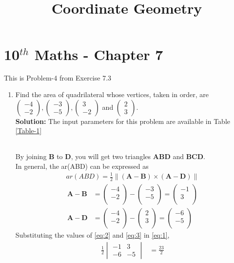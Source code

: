 \documentclass[12pt]{article}
\newcommand{\mydet}[1]{\ensuremath{\begin{vmatrix}#1\end{vmatrix}}}
\providecommand{\brak}[1]{\ensuremath{\left(#1\right)}}
\providecommand{\norm}[1]{\left\lVert#1\right\rVert}
\newcommand{\solution}{\noindent \textbf{Solution: }}
\newcommand{\myvec}[1]{\ensuremath{\begin{pmatrix}#1\end{pmatrix}}}
\let\vec\mathbf
\begin{document}
\begin{center}
\title{\textbf{Coordinate Geometry}}
\date{\vspace{-5ex}} %
\maketitle
\end{center}
\setcounter{page}{1}
\section*{10$^{th}$ Maths - Chapter 7}
This is Problem-4 from Exercise 7.3
\begin{enumerate}
\item Find the area of quadrilateral whose vertices, taken in order, are $\myvec{-4 \\ -2}, \myvec{-3\\-5}, \myvec{3\\-2}$ and $\myvec{2\\3}$.\\
	\solution The input parameters for this problem are available in Table \eqref{Table-1}
\begin{table}[ht!]\centering

\caption{}
\label{Table-1}	
\end{table}
\\By joining $\vec{B}$ to $\vec{D}$, you will get two triangles $\vec{A}\vec{B}\vec{D}$ and $\vec{B}\vec{C}\vec{D}$.\\
		In general, the ar(ABD) can be expressed as
  \begin{align}
	  ar(ABD)=\frac{1}{2} \norm{\brak{\vec{A}-\vec{B}}  \times 
   \brak{\vec{A}- \vec{D}}} \label{eq:1} 
\end{align}
\begin{align}
	\vec{A}- \vec{B} &= \myvec{-4\\-2\\}-\myvec{-3\\-5\\}=\myvec{-1\\3\\}\label{eq:2}\\
	  \vec{A}- \vec{D} &= \myvec{-4\\-2\\}-\myvec{2\\3\\}=\myvec{-6\\-5\\}\label{eq:3}
  \end{align}
Substituting the values of \eqref{eq:2} and \eqref{eq:3} in \eqref{eq:1},
\begin{align}
	\frac{1}{2}\mydet{-1 & 3\\-6 & -5}  
	&=	\frac{23}{2}
\end{align}


\end{enumerate}
\end{document}
